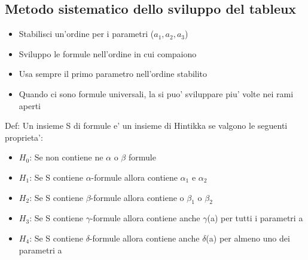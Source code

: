 \documentclass{article}
\begin{document}
         \subsection{Metodo sistematico dello sviluppo del tableux}
         \begin{itemize}
           \item Stabilisci un'ordine per i parametri ($a_1,a_2,a_3$)
           \item Sviluppo le formule nell'ordine in cui compaiono
           \item Usa sempre il primo parametro nell'ordine stabilito
           \item Quando ci sono formule universali, la si puo' sviluppare piu' volte nei rami aperti
         \end{itemize}
         \begin{flushleft}
           Def: Un insieme S di formule e' un insieme di Hintikka se valgono le seguenti proprieta':
           \begin{itemize}
             \item $H_0$: Se non contiene ne $\alpha$ o $\beta$ formule
             \item $H_1$: Se S contiene $\alpha$-formule allora contiene $\alpha_1$ e $\alpha_2$
             \item $H_2$: Se S contiene $\beta$-formule allora contiene o $\beta_1$ o $\beta_2$
             \item $H_3$: Se S contiene $\gamma$-formule allora contiene anche $\gamma$(a) per tutti i parametri a
             \item $H_4$: Se S contiene $\delta$-formule allora contiene anche $\delta$(a) per almeno uno dei parametri a
           \end{itemize}
         \end{flushleft}
\end{document}
